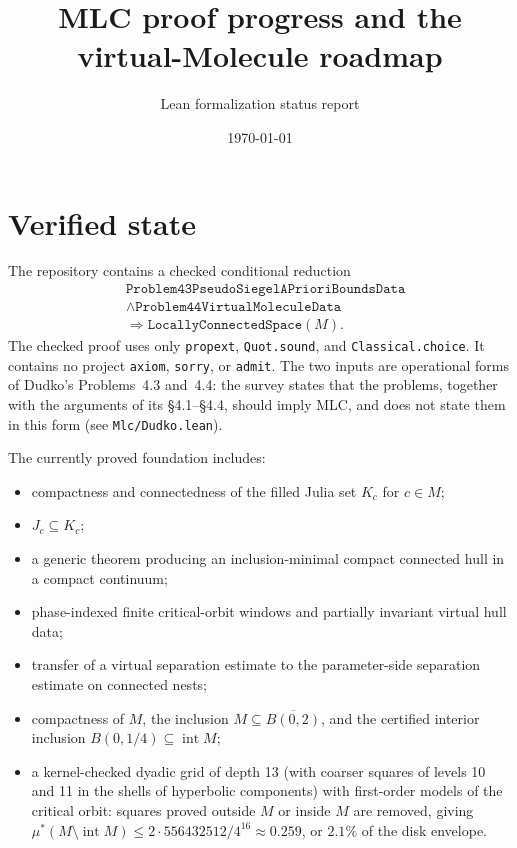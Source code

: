 \documentclass[11pt,a4paper]{article}
\title{MLC proof progress and the virtual-Molecule roadmap}
\author{Lean formalization status report}
\date{\today}
\begin{document}
\maketitle

\section{Verified state}

The repository contains a checked conditional reduction
\[
  \begin{aligned}
  &\texttt{Problem43PseudoSiegelAPrioriBoundsData}\\
  &\land\texttt{Problem44VirtualMoleculeData}\\
  &\Longrightarrow
  \texttt{LocallyConnectedSpace}(M).
  \end{aligned}
\]
The checked proof uses only \texttt{propext}, \texttt{Quot.sound}, and
\texttt{Classical.choice}. It contains no project \texttt{axiom},
\texttt{sorry}, or \texttt{admit}. The two inputs are operational forms of Dudko's Problems~4.3
and~4.4: the survey states that the problems, together with the arguments of its \S4.1--\S4.4,
should imply MLC, and does not state them in this form (see \texttt{Mlc/Dudko.lean}).

The currently proved foundation includes:

\begin{itemize}
  \item compactness and connectedness of the filled Julia set \(K_c\) for
        \(c\in M\);
  \item \(J_c\subseteq K_c\);
  \item a generic theorem producing an inclusion-minimal compact connected
        hull in a compact continuum;
  \item phase-indexed finite critical-orbit windows and partially invariant
        virtual hull data;
  \item transfer of a virtual separation estimate to the parameter-side
        separation estimate on connected nests;
  \item compactness of \(M\), the inclusion \(M\subseteq
        \overline{B(0,2)}\), and the certified interior inclusion
        \(B(0,1/4)\subseteq\operatorname{int}M\);
  \item a kernel-checked dyadic grid of depth 13 (with coarser squares of
        levels 10 and 11 in the shells of hyperbolic components) with
        first-order models of the critical orbit: squares proved outside \(M\)
        or inside \(M\) are removed, giving
        \(\mu^*(M\setminus\operatorname{int}M)\leq 2\cdot556432512/4^{16}
        \approx 0.259\), or \(2.1\%\) of the disk envelope.
\end{itemize}
\end{document}
